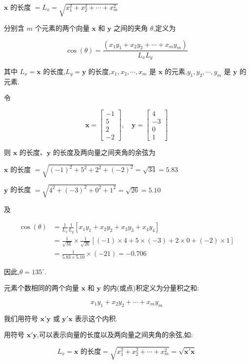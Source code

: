 
$\bm{x}$ 的长度 $= L_x = \sqrt{x_1^2 + x_2^2 + \cdots + x_m^2}$

 \quad 分别含 $m$ 个元素的两个向量 $\bm{x}$ 和 $\bm{y}$ 之间的夹角 $\theta$,定义为

\[
\cos(\theta) = \frac{(x_1 y_1 + x_2 y_2 + \cdots + x_m y_m)}{L_x L_y}
\]

其中 $L_x = \bm{x}$ 的长度,$L_y = \bm{y}$ 的长度,$x_1 ,x_2 ,\cdots ,x_m$ 是 $\bm{x}$ 的元素,$y_1 ,y_2 ,\cdots ,y_m$ 是 $\bm{y}$ 的元素.

令

\[
\bm{x} = \begin{bmatrix} -1 \\ 5 \\ 2 \\ -2 \end{bmatrix}, \quad
\bm{y} = \begin{bmatrix} 4 \\ -3 \\ 0 \\ 1 \end{bmatrix}
\]

则 $\bm{x}$ 的长度、$\bm{y}$ 的长度及两向量之间夹角的余弦为

$\bm{x}$ 的长度 $= \sqrt{(-1)^2 + 5^2 + 2^2 + (-2)^2} = \sqrt{34} = 5.83$

$\bm{y}$ 的长度 $= \sqrt{4^2 + (-3)^2 + 0^2 + 1^2} = \sqrt{26} = 5.10$

及

\begin{align*}
\cos(\theta) &= \frac{1}{L_x} \frac{1}{L_y} [x_1 y_1 + x_2 y_2 + x_3 y_3 + x_4 y_4] \\
&= \frac{1}{\sqrt{34}} \times \frac{1}{\sqrt{26}} [(-1) \times 4 + 5 \times (-3) + 2 \times 0 + (-2) \times 1] \\
&= \frac{1}{5.83 \times 5.10} \times (-21) = -0.706
\end{align*}

因此,$\theta = 135^\circ$.

 \quad 元素个数相同的两个向量 $\bm{x}$ 和 $\bm{y}$ 的内(或点)积定义为分量积之和:

\[
x_1 y_1 + x_2 y_2 + \cdots + x_m y_m
\]

我们用符号 $\bm{x}'\bm{y}$ 或 $\bm{y}'\bm{x}$ 表示这个内积.

用符号 $\bm{x}'\bm{y}$,可以表示向量的长度以及两向量之间夹角的余弦,如:

\[
L_x = \bm{x} \text{ 的长度} = \sqrt{x_1^2 + x_2^2 + \cdots + x_m^2} = \sqrt{\bm{x}'\bm{x}}
\]

